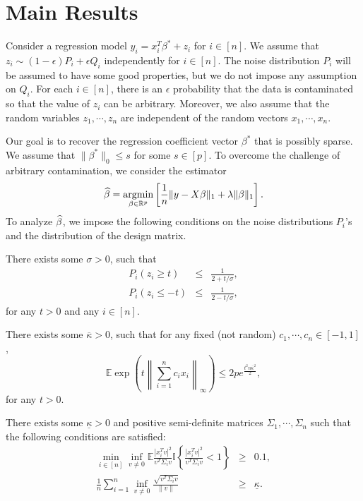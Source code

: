 
\section{Main Results}
\label{sec:main}

Consider a regression model $y_i=x_i^T\beta^*+z_i$ for $i\in[n]$. We assume that $z_i\sim (1-\epsilon)P_i+\epsilon Q_i$ independently for $i\in[n]$. The noise distribution $P_i$ will be assumed to have some good properties, but we do not impose any assumption on $Q_i$. For each $i\in[n]$, there is an $\epsilon$ probability that the data is contaminated so that the value of $z_i$ can be arbitrary. Moreover, we also assume that the random variables $z_1,\cdots,z_n$ are independent of the random vectors $x_1,\cdots,x_n$.

Our goal is to recover the regression coefficient vector $\beta^*$ that is possibly sparse. We assume that $\|\beta^*\|_0\leq s$ for some $s\in[p]$. To overcome the challenge of arbitrary contamination, we
consider the estimator
$$\widehat{\beta}=\mathop{\rm argmin}_{\beta\in\mathbb{R}^p}\left[\frac{1}{n}\|y-X\beta\|_1+\lambda\|\beta\|_1\right].$$
To analyze $\widehat{\beta}$, we impose the following conditions on the noise distributions $P_i$'s and the distribution of the design matrix.

\begin{condn}
There exists some $\sigma>0$, such that
\begin{eqnarray*}
P_i\left(z_i \geq t\right) &\leq& \frac{1}{2 + t/\sigma}, \\
P_i\left(z_i \leq -t\right) &\leq& \frac{1}{2-t/\sigma},
\end{eqnarray*}
for any $t>0$ and any $i\in[n]$.
\end{condn}

\begin{conda}
There exists some $\overline{\kappa}>0$, such that for any fixed (not random) $c_1,\cdots,c_n\in[-1,1]$,
$$\mathbb{E}\exp\left(t\left\|\sum_{i=1}^nc_ix_i\right\|_{\infty}\right)\leq 2pe^{\frac{t^2n\overline{\kappa}^2}{2}},$$
for any $t>0$.
\end{conda}

\begin{condb}
There exists some $\underline{\kappa}>0$ and positive semi-definite matrices $\Sigma_1,\cdots,\Sigma_n$ such that the following conditions are satisfied:
\begin{eqnarray}
\label{eq:B1} \min_{i\in[n]}\inf_{v\neq 0}\mathbb{E}\frac{|x_i^Tv|^2}{v^T\Sigma_iv}\mathbb{I}\left\{\frac{|x_i^Tv|^2}{v^T\Sigma_iv}<1\right\} &\geq& 0.1, \\
\label{eq:B2} \frac{1}{n}\sum_{i=1}^n\inf_{v\neq 0}\frac{\sqrt{v^T\Sigma_iv}}{\|v\|} &\geq& \underline{\kappa}.
\end{eqnarray}
\end{condb}

